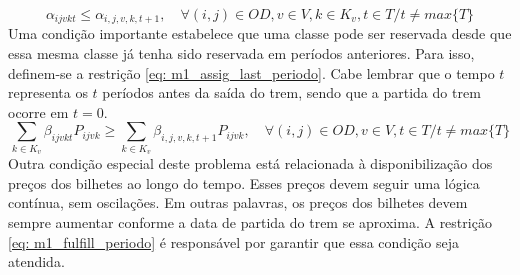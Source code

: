 \vspace{-1cm}

\begin{equation}
	\alpha_{ijvkt} \leq \alpha_{i,j,v,k,t+1}, \quad   \forall(i,j) \in OD, v \in V, k \in K_v, t \in T/ t \neq max\{T\}     \label{eq: m1_assig_last_periodo}
\end{equation}
Uma condição importante estabelece que uma classe pode ser reservada desde que essa mesma classe já tenha sido reservada em períodos anteriores. Para isso, definem-se a restrição \eqref{eq: m1_assig_last_periodo}. Cabe lembrar que o tempo $t$ representa os $t$ períodos antes da saída do trem, sendo que a partida do trem ocorre em $t = 0$.
\begin{equation}
	\sum_{k \in K_v}\beta_{ijvkt}P_{ijvk} \geq \sum_{k \in K_v}\beta_{i,j,v,k,t+1}P_{ijvk},  \quad   \forall(i,j) \in OD, v \in V, t \in T/ t \neq max\{T\}   \label{eq: m1_fulfill_periodo}
\end{equation}
Outra condição especial deste problema está relacionada à disponibilização dos preços dos bilhetes ao longo do tempo. Esses preços devem seguir uma lógica contínua, sem oscilações. Em outras palavras, os preços dos bilhetes devem sempre aumentar conforme a data de partida do trem se aproxima. A restrição \eqref{eq: m1_fulfill_periodo} é responsável por garantir que essa condição seja atendida.

